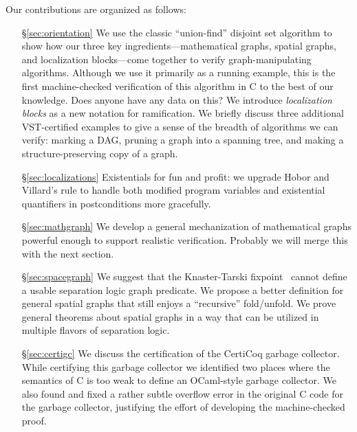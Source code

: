 Our contributions are organized as follows:
\begin{itemize}
\item[\S\ref{sec:orientation}] We use the classic ``union-find'' disjoint set algorithm to show how our three key ingredients---mathematical graphs, spatial graphs, and localization blocks---come together to verify graph-manipulating algorithms.  Although we use it primarily as a running example, this is the first machine-checked verification of this algorithm in C to the best of our knowledge. {\color{blue} Does anyone have any data on this?}  {\color{magenta} We introduce \emph{localization blocks} as a new notation for ramification. We briefly discuss three additional VST-certified examples to give a sense of the breadth of algorithms we can verify: marking a DAG, pruning a graph into a spanning tree, and making a structure-preserving copy of a graph.}
\item[\S\ref{sec:localizations}] {\color{magenta} Existentials for fun and profit: we upgrade Hobor and Villard's  rule to handle both modified program variables and existential quantifiers in postconditions more gracefully.}
\item[\S\ref{sec:mathgraph}] We develop a general mechanization of mathematical graphs powerful enough to support realistic verification. {\color{magenta}Probably we will merge this with the next section.} %
\item[\S\ref{sec:spacegraph}] We suggest that the Knaster-Tarski fixpoint~\cite{tarski:fixpoint} cannot define a usable separation logic graph predicate.  We propose a better definition for general spatial graphs that still enjoys a ``recursive'' fold/unfold.  We prove general theorems about spatial graphs in a way that can be utilized in multiple flavors of separation logic. %
\item[\S\ref{sec:certigc}] We discuss the certification of the CertiCoq garbage collector. While certifying this garbage collector we identified two places where the semantics of C is too weak to define an OCaml-style garbage collector.  We also found and fixed a rather subtle overflow error in the original C code for the garbage collector, justifying the effort of developing the machine-checked proof.

\end{itemize}
